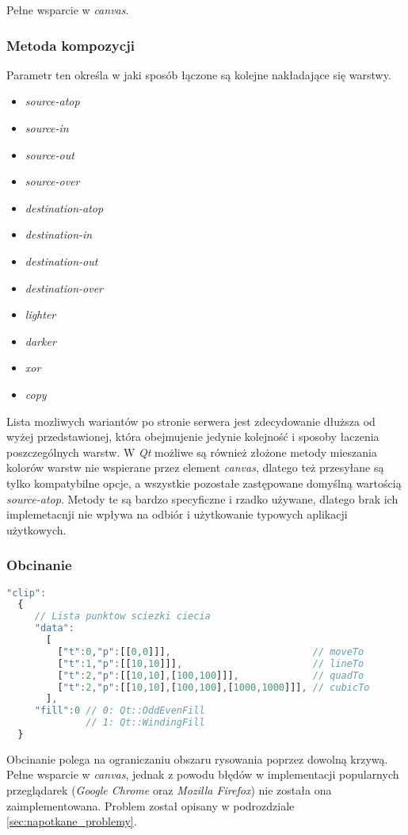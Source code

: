 Pełne wsparcie w \emph{canvas}. 

\subsubsection{Metoda kompozycji}
Parametr ten określa w jaki sposób łączone są kolejne nakładające się warstwy.\cite{compositionmode}
\begin{itemize}
\item \emph{source-atop}
\item \emph{source-in}
\item \emph{source-out}
\item \emph{source-over}
\item \emph{destination-atop}
\item \emph{destination-in}
\item \emph{destination-out}
\item \emph{destination-over}
\item \emph{lighter}
\item \emph{darker}
\item \emph{xor}
\item \emph{copy}
\end{itemize}

Lista mozliwych wariantów po stronie serwera jest zdecydowanie dłuższa od wyżej przedstawionej, która obejmujenie jedynie kolejność i sposoby łaczenia poszczególnych warstw. W \emph{Qt} możliwe są również złożone metody mieszania kolorów warstw nie wspierane przez element \emph{canvas}, dlatego też przesyłane są tylko kompatybilne opcje, a wszystkie pozostałe zastępowane domyślną wartością \emph{source-atop}. Metody te są bardzo specyficzne i rzadko używane, dlatego brak ich implemetacnji nie wpływa na odbiór i użytkowanie typowych aplikacji użytkowych.

\subsubsection{Obcinanie}
\begin{lstlisting}[language=JavaScript,numbers=none]
"clip":
  {
     // Lista punktow sciezki ciecia
     "data":			
       [
         ["t":0,"p":[[0,0]]],                         // moveTo
         ["t":1,"p":[[10,10]]],                       // lineTo
         ["t":2,"p":[[10,10],[100,100]]],             // quadTo
         ["t":2,"p":[[10,10],[100,100],[1000,1000]]], // cubicTo
       ],
     "fill":0 // 0: Qt::OddEvenFill
              // 1: Qt::WindingFill
  }
\end{lstlisting}
Obcinanie polega na ograniczaniu obszaru rysowania poprzez dowolną krzywą. 
Pełne wsparcie w \emph{canvas}, jednak z powodu błędów w implementacji popularnych przeglądarek (\emph{Google Chrome} oraz \emph{Mozilla Firefox}) nie została ona zaimplementowana. Problem został opisany w podrozdziale \ref{sec:napotkane_problemy}.